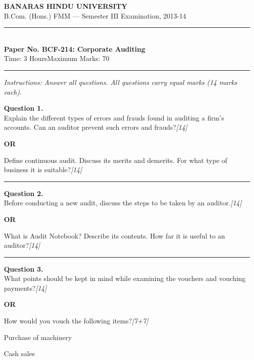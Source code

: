 \documentclass[11pt,a4paper]{article}
\newcommand{\pts}[1]{\hfill   \textit{[#1]}}
\begin{document}
\begin{center}
  {\large\bfseries BANARAS HINDU UNIVERSITY}\\[2pt]
  {\normalsize B.Com. (Hons.) FMM --- Semester III Examination, 2013-14}\\[6pt]
  \rule{0.8\linewidth}{0.5pt}\\[6pt]
  {\large\bfseries Paper No. BCF-214: Corporate Auditing}\\[4pt]
  {\normalsize Time: 3 Hours\hfill Maximum Marks: 70}
\end{center}

\rule{\linewidth}{0.4pt}

\smallskip



\noindent   \textit{Instructions: Answer all questions. All questions carry equal marks (14 marks each).}

\bigskip




\noindent   \textbf{Question 1.} \\
Explain the different types of errors and frauds found in auditing a firm's accounts. Can an auditor prevent such errors and frauds?\pts{14}

\centerline{   \textbf{OR}}

Define continuous audit. Discuss its merits and demerits. For what type of business it is suitable?\pts{14}

\medskip\rule{\linewidth}{0.2pt}




\noindent   \textbf{Question 2.} \\
Before conducting a new audit, discuss the steps to be taken by an auditor.\pts{14}

\centerline{   \textbf{OR}}

What is Audit Notebook? Describe its contents. How far it is useful to an auditor?\pts{14}

\medskip\rule{\linewidth}{0.2pt}




\noindent   \textbf{Question 3.} \\
What points should be kept in mind while examining the vouchers and vouching payments?\pts{14}

\centerline{   \textbf{OR}}

How would you vouch the following items?\pts{7+7}

\begin{parts}
  \item Purchase of machinery
  \item Cash sales
\end{parts}
\end{document}
